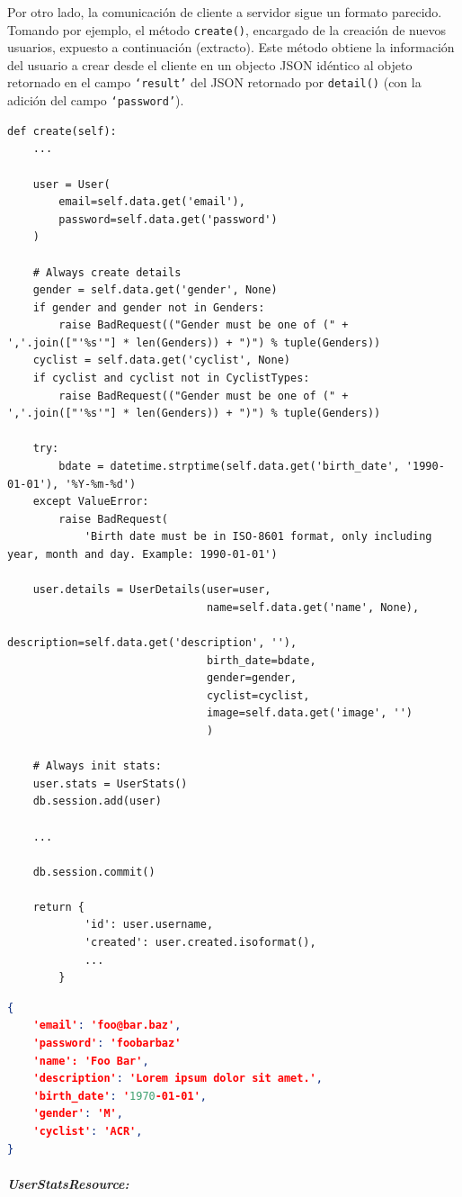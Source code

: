\documentclass[11pt,letterpaper]{article}
\begin{document}
Por otro lado, la comunicación de cliente a servidor sigue un formato parecido. Tomando por ejemplo, el método \texttt{create()}, encargado de la creación de nuevos usuarios, expuesto a continuación (extracto). Este método obtiene la información del usuario a crear desde el cliente en un objecto JSON idéntico al objeto retornado en el campo \texttt{`result'} del JSON retornado por \texttt{detail()} (con la adición del campo \texttt{`password'}).
\begin{lstlisting}[title=Extracto del método de creación de usuarios.]
def create(self):
    ...

    user = User(
        email=self.data.get('email'),
        password=self.data.get('password')
    )

    # Always create details
    gender = self.data.get('gender', None)
    if gender and gender not in Genders:
        raise BadRequest(("Gender must be one of (" + ','.join(["'%s'"] * len(Genders)) + ")") % tuple(Genders))
    cyclist = self.data.get('cyclist', None)
    if cyclist and cyclist not in CyclistTypes:
        raise BadRequest(("Gender must be one of (" + ','.join(["'%s'"] * len(Genders)) + ")") % tuple(Genders))

    try:
        bdate = datetime.strptime(self.data.get('birth_date', '1990-01-01'), '%Y-%m-%d')
    except ValueError:
        raise BadRequest(
            'Birth date must be in ISO-8601 format, only including year, month and day. Example: 1990-01-01')

    user.details = UserDetails(user=user,
                               name=self.data.get('name', None),
                               description=self.data.get('description', ''),
                               birth_date=bdate,
                               gender=gender,
                               cyclist=cyclist,
                               image=self.data.get('image', '')
                               )

    # Always init stats:
    user.stats = UserStats()
    db.session.add(user)

    ...

    db.session.commit()

    return {
            'id': user.username,
            'created': user.created.isoformat(),
            ...
        }
\end{lstlisting}
\begin{lstlisting}[language=json, title=Ejemplo de datos para solicitud de creación de usuario.]
{
    'email': 'foo@bar.baz',
    'password': 'foobarbaz'
    'name': 'Foo Bar',
    'description': 'Lorem ipsum dolor sit amet.',
    'birth_date': '1970-01-01',
    'gender': 'M',
    'cyclist': 'ACR',
}
\end{lstlisting}
\pagebreak
\subparagraph{UserStatsResource:\\}
\end{document}
